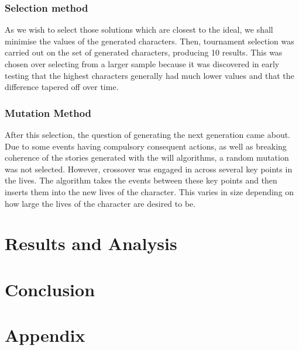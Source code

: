 \documentclass[11pt]{article}
\begin{document}
\subsubsection{Selection method}
As we wish to select those solutions which are closest to the ideal, we shall minimise the values of the generated characters. Then, tournament selection was carried out on the set of generated characters, producing 10 results. This was chosen over selecting from a larger sample because it was discovered in early testing that the highest characters generally had much lower values and that the difference tapered off over time. 

\subsubsection{Mutation Method}
After this selection, the question of generating the next generation came about. Due to some events having compulsory consequent actions, as well as breaking coherence of the stories generated with the will algorithms, a random mutation was not selected. However, crossover was engaged in across several key points in the lives. The algorithm takes the events between these key points and then inserts them into the new lives of the character. This varies in size depending on how large the lives of the character are desired to be. 


\section{Results and Analysis}

\section{Conclusion}


\printbibliography

\section{Appendix}
\end{document}
